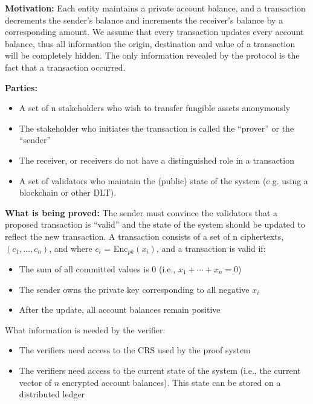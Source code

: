 \textbf{Motivation:} Each entity maintains a private account balance, and a transaction decrements the sender’s balance and increments the receiver’s balance by a corresponding amount.  We assume that every transaction updates every account balance, thus all information the origin, destination and value of a transaction will be completely hidden.  The only information revealed by the protocol is the fact that a transaction occurred.

\textbf{Parties:}
\begin{itemize}
    \item A set of n stakeholders who wish to transfer fungible assets anonymously
    \item The stakeholder who initiates the transaction is called the “prover” or the “sender”
    \item The receiver, or receivers do not have a distinguished role in a transaction
    \item A set of validators who maintain the (public) state of the system (e.g. using a blockchain or other DLT).
\end{itemize}


\textbf{What is being proved:} The sender must convince the validators that a proposed transaction is “valid” and the state of the system should be updated to reflect the new transaction.  A transaction consists of a set of n ciphertexts, $(c_1, \ldots, c_n)$, and where $c_i$ = Enc$_{pk}(x_i)$, and a transaction is valid if:\loosen
	\begin{itemize}
    \item The sum of all committed values is 0 (i.e., $x_1 + \cdots + x_n = 0$)
    \item The sender owns the private key corresponding to all negative $x_i$
    \item After the update, all account balances remain positive
	\end{itemize}

What information is needed by the verifier:
	\begin{itemize}
    \item The verifiers need access  to the CRS used by the proof system
    \item The verifiers need access to the current state of the system (i.e., the current vector of $n$ encrypted account balances).  
		This state can be stored on a distributed ledger
	\end{itemize}

